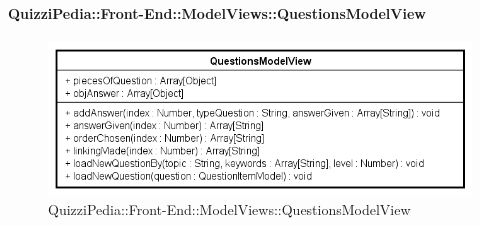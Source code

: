 \paragraph{QuizziPedia::Front-End::ModelViews::QuestionsModelView}

\label{QuizziPedia::Front-End::ModelViews::QuestionsModelView}

\begin{figure}[ht]
	\centering
	\includegraphics[scale=0.8,keepaspectratio]{UML/Classi/Front-End/QuizziPedia_Front-end_ModelView_QuestionsModelView.png}
	\caption{QuizziPedia::Front-End::ModelViews::QuestionsModelView}
\end{figure} \FloatBarrier

